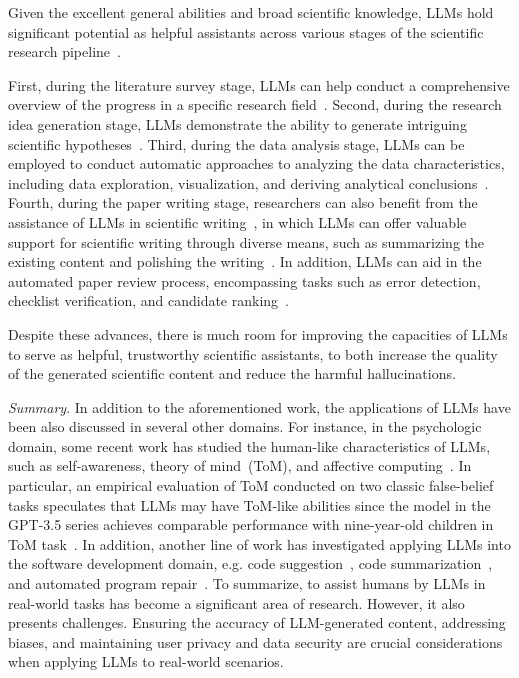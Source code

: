 Given the excellent general abilities and broad scientific knowledge, LLMs hold significant potential as helpful assistants across various stages of the scientific research pipeline~\cite{Zhang-arxiv-2023-One}. 

First, during the literature survey stage, LLMs can help conduct a comprehensive overview of the  progress in a specific research  field~\cite{Haman-2023-air-Using,Aydn-2022-ssrn-OpenAI}. Second, during the research idea generation stage, LLMs demonstrate the ability to generate intriguing scientific hypotheses~\cite{Part-2023-arxiv-Can}. Third, during the data analysis stage, LLMs can be employed to conduct automatic approaches to analyzing the data characteristics,  including data exploration, visualization, and deriving analytical conclusions~\cite{Hasaan-2023-arxiv-ChatGPT,Cheng-2023-arxiv-Is}. Fourth, during the paper writing stage,  researchers can also benefit from the assistance of LLMs in scientific writing~\cite{Alkaissi-pubmed-2023-Artificial,Azaria-2023-arxiv-ChatGPT}, in which  {LLMs can offer valuable support for scientific writing through diverse means, such as summarizing the existing  content and polishing the writing~\cite{Buruk-2023-arxiv-Academic}. } In addition, LLMs can aid in the automated paper review process, encompassing tasks such as error detection, checklist verification, and candidate ranking~\cite{Liu-2023-arxiv-ReviewerGPT}.

Despite these advances, there is much room for improving the capacities of LLMs to serve as helpful, trustworthy scientific assistants, to both increase the quality of the generated scientific content  and reduce the harmful hallucinations. 

\emph{Summary}.
In addition to the aforementioned work, the applications of LLMs have been also discussed in several other domains. For instance, in the psychologic domain, some recent work has studied the human-like characteristics of LLMs, such as self-awareness, theory of mind~(ToM), and affective computing~\cite{Kosinski-arxiv-2023-tom,Amin-arxiv-2023-affective}. In particular, {an  empirical evaluation of ToM conducted on two classic false-belief tasks} speculates that LLMs may have ToM-like abilities since the model in the GPT-3.5 series achieves comparable performance with nine-year-old children in ToM task~\cite{Kosinski-arxiv-2023-tom}. In addition, another line of work has investigated applying LLMs into the software development domain, e.g. code suggestion~\cite{Sridhara-2023-arxiv-ChatGPT}, code summarization~\cite{Sun-2023-arxiv-Automatic}, and automated program repair~\cite{Xia-2023-arxiv-Conversational}. To summarize, to assist humans by LLMs in real-world tasks has become a significant area of research. However, it also presents challenges. Ensuring the accuracy of LLM-generated content, addressing biases, and maintaining user privacy and data security are crucial considerations when applying LLMs to real-world scenarios.

